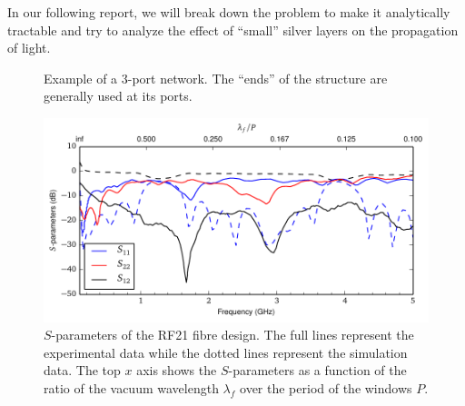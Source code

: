 In our following report, we will break down the problem
to make it analytically tractable and try to analyze the effect of ``small''
silver layers on the propagation of light. 

\begin{figure}
 \begin{center}
 \end{center}
 \caption[Example of a 3-port network]{Example of a 3-port network. The ``ends'' of the structure are generally used at its ports.}
 \label{fig:antenna.network}
\end{figure}

\begin{figure}
 \centering
 \includegraphics[width=\textwidth]{figs/active/sParametersRF21.pdf}
 \caption[$S$-parameters of the RF21 fibre design]{$S$-parameters of the RF21 fibre design. The full lines represent
	  the experimental data while the dotted lines represent the simulation data.
	  The top $x$ axis shows the $S$-parameters as a function of the ratio of the 
	  vacuum wavelength $\lambda_f$ over the period of the windows $P$.}
 \label{fig:antenna.sParameters}
\end{figure}

